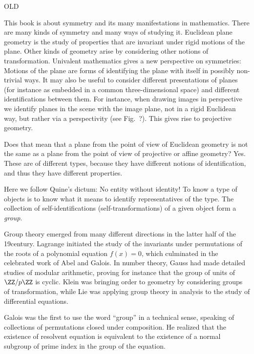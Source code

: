 OLD

This book is about symmetry and its many manifestations in mathematics.
There are many kinds of symmetry and many ways of studying it.
Euclidean plane geometry is the study of properties that are invariant under rigid motions of the plane.
Other kinds of geometry arise by considering other notions of transformation.
Univalent mathematics gives a new perspective on symmetries:
Motions of the plane are forms of identifying the plane with itself in possibly non-trivial ways.
It may also be useful to consider different presentations of planes
(for instance as embedded in a common three-dimensional space)
and different identifications between them.
For instance, when drawing images in perspective
we identify planes in the scene with the image plane,
not in a rigid Euclidean way, but
rather via a perspectivity (see Fig.~?).
This gives rise to projective geometry.

Does that mean that a plane from the point of view of Euclidean
geometry is not the same as a plane from the point of view of
projective or affine geometry?
Yes.
These are of different types,
because they have different notions of identification,
and thus they have different properties.

Here we follow Quine's dictum: No entity without identity!
To know a type of objects is to know what it means to identify representatives of the type.
The collection of self-identifications (self-transformations) of a given object form a \emph{group}.


Group theory emerged from many different directions in the latter half of the 19\th century.
Lagrange initiated the study of the invariants under permutations
of the roots of a polynomial equation $f(x)=0$,
which culminated in the celebrated work of Abel and Galois.
In number theory, Gauss had made detailed studies of modular arithmetic,
proving for instance that the group of units of $\ZZ/p\ZZ$ is cyclic.
Klein was bringing order to geometry by considering groups of transformation,
while Lie was applying group theory in analysis to the study of differential equations.

Galois was the first to use the word ``group'' in a technical sense,
speaking of collections of permutations closed under composition.
He realized that the existence of resolvent equation is equivalent
to the existence of a normal subgroup of prime index
in the group of the equation.

